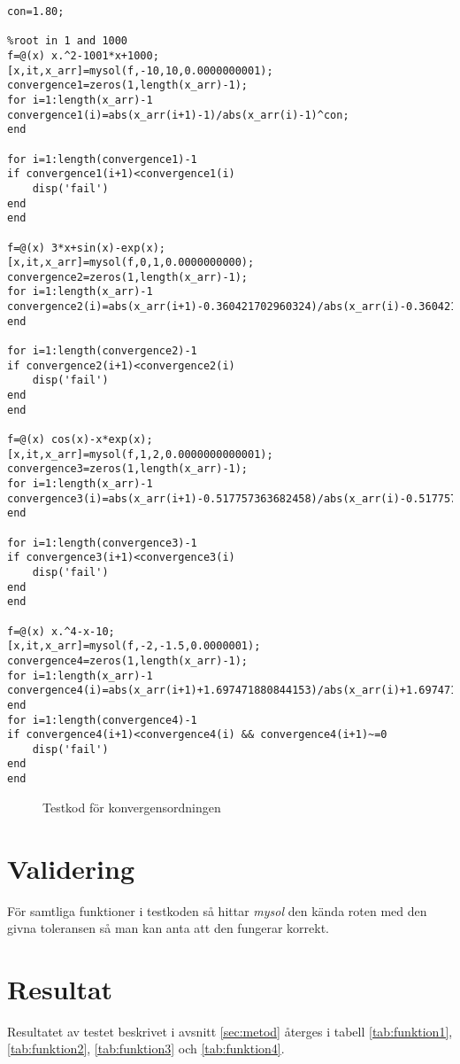\documentclass[titlepage, a4paper]{article}
\begin{document}
  \begin{lstlisting}
con=1.80;

%root in 1 and 1000
f=@(x) x.^2-1001*x+1000;
[x,it,x_arr]=mysol(f,-10,10,0.0000000001);
convergence1=zeros(1,length(x_arr)-1);
for i=1:length(x_arr)-1
convergence1(i)=abs(x_arr(i+1)-1)/abs(x_arr(i)-1)^con;
end

for i=1:length(convergence1)-1
if convergence1(i+1)<convergence1(i)
    disp('fail')
end
end

f=@(x) 3*x+sin(x)-exp(x);
[x,it,x_arr]=mysol(f,0,1,0.0000000000);
convergence2=zeros(1,length(x_arr)-1);
for i=1:length(x_arr)-1
convergence2(i)=abs(x_arr(i+1)-0.360421702960324)/abs(x_arr(i)-0.360421702960324)^con;
end

for i=1:length(convergence2)-1
if convergence2(i+1)<convergence2(i)
    disp('fail')
end
end

f=@(x) cos(x)-x*exp(x);
[x,it,x_arr]=mysol(f,1,2,0.0000000000001);
convergence3=zeros(1,length(x_arr)-1);
for i=1:length(x_arr)-1
convergence3(i)=abs(x_arr(i+1)-0.517757363682458)/abs(x_arr(i)-0.517757363682458)^con;
end

for i=1:length(convergence3)-1
if convergence3(i+1)<convergence3(i)
    disp('fail')
end
end

f=@(x) x.^4-x-10;
[x,it,x_arr]=mysol(f,-2,-1.5,0.0000001);
convergence4=zeros(1,length(x_arr)-1);
for i=1:length(x_arr)-1
convergence4(i)=abs(x_arr(i+1)+1.697471880844153)/abs(x_arr(i)+1.697471880844153)^con;
end
for i=1:length(convergence4)-1
if convergence4(i+1)<convergence4(i) && convergence4(i+1)~=0 
    disp('fail')
end
end
  \end{lstlisting}
  \begin{figure}[H]
  \caption{Testkod för konvergensordningen}
  \label{lst:test}
\end{figure}

\section{Validering}
För samtliga funktioner i testkoden så hittar \textit{mysol} den kända roten med den givna toleransen så man kan anta att den fungerar korrekt.
\section{Resultat}
Resultatet av testet beskrivet i avsnitt \ref{sec:metod} återges i tabell \ref{tab:funktion1}, \ref{tab:funktion2}, \ref{tab:funktion3} och \ref{tab:funktion4}.
\end{document}

